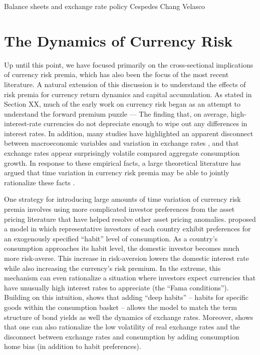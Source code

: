 \documentclass{ar-1col}
\begin{document}
Balance sheets and exchange rate policy Cespedes Chang Velasco 


\section{The Dynamics of Currency Risk}


Up until this point, we have focused primarily on the cross-sectional implications of currency risk premia, which has also been the focus of the most recent literature. A natural extension of this discussion is to understand the effects of risk premia for currency return dynamics and capital accumulation. As stated in Section XX, much of the early work on currency risk began as an attempt to understand the forward premium puzzle --- The finding that, on average, high-interest-rate currencies do not depreciate enough to wipe out any differences in interest rates. In addition, many studies have highlighted an apparent disconnect between macroeconomic variables and variation in exchange rates \citep{MeeseRogoff1983,BackusSmith1993}, and that exchange rates appear surprisingly volatile compared aggregate consumption growth. In response to these empirical facts, a large theoretical literature has argued that time variation in currency risk premia may be able to jointly rationalize these facts \citep{Fama1984,Backusetal2001}.

One strategy for introducing large amounts of time variation of currency risk premia involves using more complicated investor preferences from the asset pricing literature that have helped resolve other asset pricing anomalies. \citet{Verdelhan2010} proposed a model in which representative investors of each country exhibit preferences for an exogenously specified ``habit'' level of consumption. As a country's consumption approaches its habit level, the domestic investor becomes much more risk-averse. This increase in risk-aversion lowers the domestic interest rate while also increasing the currency's risk premium. In the extreme, this mechanism can even rationalize a situation where investors expect currencies that have unusually high interest rates to appreciate (the ``Fama conditions'').  Building on this intuition, \citet{Heyerdahl-Larsen2011} shows that adding ``deep habits'' -- habits for specific goods within the consumption basket -- allows the model to match the term structure of bond yields as well the dynamics of exchange rates. Moreover, \citet{Stathopoulos2017} shows that one can also rationalize the low volatility of real exchange rates and the disconnect between exchange rates and consumption by adding consumption home bias (in addition to habit preferences). 
\end{document}
